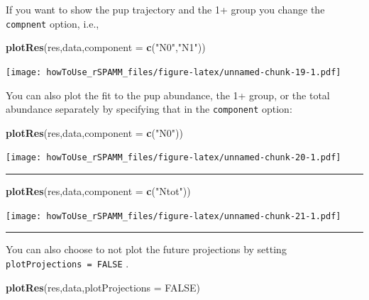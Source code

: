 \documentclass[
]{article}
\newenvironment{Shaded}{\begin{snugshade}}{\end{snugshade}}
\newcommand{\DataTypeTok}[1]{\textcolor[rgb]{0.13,0.29,0.53}{#1}}
\newcommand{\KeywordTok}[1]{\textcolor[rgb]{0.13,0.29,0.53}{\textbf{#1}}}
\newcommand{\NormalTok}[1]{#1}
\newcommand{\OtherTok}[1]{\textcolor[rgb]{0.56,0.35,0.01}{#1}}
\newcommand{\StringTok}[1]{\textcolor[rgb]{0.31,0.60,0.02}{#1}}
\begin{document}
If you want to show the pup trajectory and the 1+ group you change the
\texttt{compnent} option, i.e.,

\begin{Shaded}
\begin{Highlighting}[]
\KeywordTok{plotRes}\NormalTok{(res,data,}\DataTypeTok{component =} \KeywordTok{c}\NormalTok{(}\StringTok{"N0"}\NormalTok{,}\StringTok{"N1"}\NormalTok{))}
\end{Highlighting}
\end{Shaded}

\texttt{[image: howToUse\_rSPAMM\_files/figure-latex/unnamed-chunk-19-1.pdf]}

You can also plot the fit to the pup abundance, the 1+ group, or the
total abundance separately by specifying that in the \texttt{component}
option:

\begin{Shaded}
\begin{Highlighting}[]
\KeywordTok{plotRes}\NormalTok{(res,data,}\DataTypeTok{component =} \KeywordTok{c}\NormalTok{(}\StringTok{"N0"}\NormalTok{))}
\end{Highlighting}
\end{Shaded}

\texttt{[image: howToUse\_rSPAMM\_files/figure-latex/unnamed-chunk-20-1.pdf]}

\begin{center}\rule{0.5\linewidth}{0.5pt}\end{center}

\begin{Shaded}
\begin{Highlighting}[]
\KeywordTok{plotRes}\NormalTok{(res,data,}\DataTypeTok{component =} \KeywordTok{c}\NormalTok{(}\StringTok{"Ntot"}\NormalTok{))}
\end{Highlighting}
\end{Shaded}

\texttt{[image: howToUse\_rSPAMM\_files/figure-latex/unnamed-chunk-21-1.pdf]}

\begin{center}\rule{0.5\linewidth}{0.5pt}\end{center}

You can also choose to not plot the future projections by setting
\texttt{plotProjections\ =\ FALSE} .

\begin{Shaded}
\begin{Highlighting}[]
\KeywordTok{plotRes}\NormalTok{(res,data,}\DataTypeTok{plotProjections =} \OtherTok{FALSE}\NormalTok{)}
\end{Highlighting}
\end{Shaded}
\end{document}
